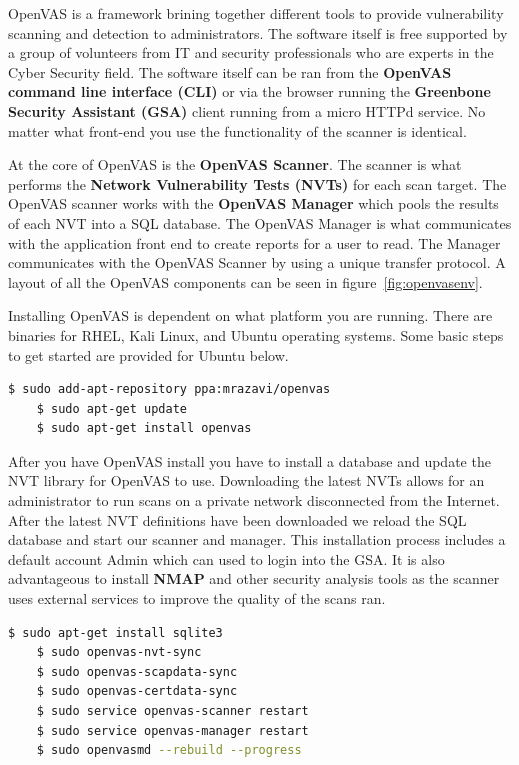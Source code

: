 \documentclass[12pt]{article}
\begin{document}
OpenVAS is a framework brining together different tools to provide 
vulnerability scanning and detection to administrators. The software
itself is free supported by a group of volunteers from IT and security 
professionals who are experts in the Cyber Security field. The software itself
can be ran from the \textbf{OpenVAS command line interface (CLI)} or via the 
browser running the \textbf{Greenbone Security Assistant (GSA)} client running 
from a micro HTTPd service. No matter what front-end you use the 
functionality of the scanner is identical. 

At the core of OpenVAS is the \textbf{OpenVAS Scanner}. The scanner is what 
performs the \textbf{Network Vulnerability Tests (NVTs)} for each scan target. 
The OpenVAS scanner works with the \textbf{OpenVAS Manager} which pools the 
results of each NVT into a SQL database. The OpenVAS Manager is what 
communicates with the application front end to create reports for a user 
to read. The Manager communicates with the OpenVAS Scanner by using a unique 
transfer protocol. A layout of all the OpenVAS components can be seen in 
figure~\ref{fig:openvasenv}.

Installing OpenVAS is dependent on what platform you are running. There are 
binaries for RHEL, Kali Linux, and Ubuntu operating systems. Some basic
steps to get started are provided for Ubuntu below.

\begin{lstlisting}[language=bash]
    $ sudo add-apt-repository ppa:mrazavi/openvas
    $ sudo apt-get update
    $ sudo apt-get install openvas
\end{lstlisting}

After you have OpenVAS install you have to install a database and update
the NVT library for OpenVAS to use. Downloading the latest NVTs allows for
an administrator to run scans on a private network disconnected from the 
Internet. After the latest NVT definitions have been downloaded we reload
the SQL database and start our scanner and manager. This installation process
includes a default account Admin which can used to login into the GSA. It
is also advantageous to install \textbf{NMAP} and other security analysis
tools as the scanner uses external services to improve the quality of the
scans ran. 

\begin{lstlisting}[language=bash]
    $ sudo apt-get install sqlite3
    $ sudo openvas-nvt-sync
    $ sudo openvas-scapdata-sync
    $ sudo openvas-certdata-sync
    $ sudo service openvas-scanner restart
    $ sudo service openvas-manager restart
    $ sudo openvasmd --rebuild --progress
\end{lstlisting}
\end{document}
